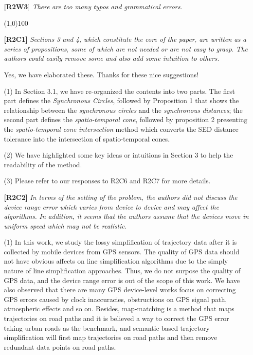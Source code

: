 \documentclass{letter}
\begin{document}
\textbf{[R2W3]} \emph{There are too many typos and grammatical errors.}

\line(1,0){100}

\textbf{[R2C1]} \emph{Sections 3 and 4, which constitute the core of the paper, are written as a series of propositions, some of which are not needed or are not easy to grasp.
The authors could easily remove some and also add some intuition to others.}

Yes, we have elaborated these. Thanks for these nice suggestions!

(1) In Section 3.1, we have re-organized the contents into two parts. The first part defines the \emph{Synchronous Circles}, followed by Proposition 1 that shows the relationship between the \textit{synchronous circles} and the \textit{synchronous distances}; the second part defines the \textit{spatio-temporal cone}, followed by proposition 2 presenting the \textit{spatio-temporal cone intersection} method which converts the SED distance tolerance into the intersection of spatio-temporal cones.

(2) We have highlighted some key ideas or intuitions in Section 3 to help the readability of the method.

(3) Please refer to our responses to R2C6 and R2C7 for more details.

\textbf{[R2C2]} \emph{In terms of the setting of the problem, the authors did not discuss the device range error which varies from device to device and may affect the algorithms.
In addition, it seems that the authors assume that the devices move in uniform speed which may not be realistic.
}

(1) In this work, we study the lossy simplification of trajectory data after it is collected by mobile devices from GPS sensors. The quality of GPS data should not have obvious affects on line simplification algorithms due to the simply nature of line simplification approaches. Thus, we do not surpose the quality of GPS data, and the device range error is out of the scope of this work. 
%
We have also observed that there are many GPS device-level works focus on correcting GPS errors caused by clock inaccuracies, obstructions on GPS signal path, atmospheric effects and so on. Besides, map-matching is a method that maps trajectories on road paths and it is believed a way to correct the GPS error taking urban roads as the benchmark, and semantic-based trajectory simplification will first map trajectories on road paths and then remove redundant data points on road paths.  
\end{document}
